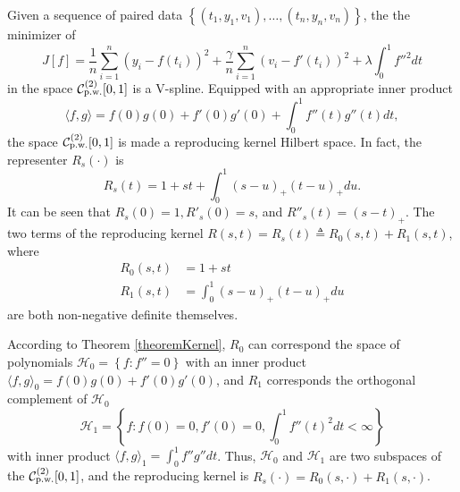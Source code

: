 Given a sequence of paired data $\left\lbrace (t_1,y_1,v_1),\ldots, (t_n,y_n,v_n) \right\rbrace$, the the minimizer of 
\begin{equation}\label{maineq}
J[f]=\frac{1}{n}\sum_{i=1}^{n}(y_i-f(t_i))^2+\frac{\gamma}{n}\sum_{i=1}^{n}(v_i-f'(t_i))^2+\lambda \int_{0}^{1}f''^2dt
\end{equation}
in the space $\mathcal{C}_{\mbox{\scriptsize p.w.}}^{(2)}[0,1]$ is a V-spline. Equipped with an appropriate inner product
\begin{equation}\label{TractorSplineInnerProduct}
\langle f,g \rangle=f(0) g(0)+f'(0) g'(0)+\int_{0}^{1}f''(t)g''(t)dt,
\end{equation}
the space $\mathcal{C}_{\mbox{\scriptsize p.w.}}^{(2)}[0,1]$ is made a reproducing kernel Hilbert space. In fact, the representer $R_s(\cdot)$ is 
\begin{equation}\label{kerneleq}
R_s(t)=1+st+\int_{0}^{1} (s-u)_+(t-u)_+du.
\end{equation}
It can be seen that $R_s(0)=1, R'_s(0)=s$, and $R''_s(t)=(s-t)_+$. The two terms of the reproducing kernel $R(s,t)=R_s(t)\triangleq R_0(s,t)+R_1(s,t)$, where
\begin{align} \label{TractorSplineKernelR0}
R_0(s,t)&=1+st \\ \label{TractorSplineKernelR1}
R_1(s,t)&=\int_{0}^{1} (s-u)_+(t-u)_+du
\end{align}
are both non-negative definite themselves.


According to Theorem \ref{theoremKernel}, $R_0$ can correspond the space of polynomials $\mathcal{H}_0=\left\lbrace f:f''=0\right\rbrace$ with an inner product $\langle f,g \rangle_0= f(0)g(0)+f'(0)g'(0)$, and $R_1$ corresponds the orthogonal complement of $\mathcal{H}_0$
\begin{equation}
\mathcal{H}_1=\left\lbrace f:f(0)=0, f'(0)=0, \int_{0}^{1}f''(t)^2dt<\infty\right\rbrace
\end{equation}
with inner product $\langle f,g \rangle_1=\int_{0}^{1}f''g''dt$. Thus, $\mathcal{H}_0$ and $\mathcal{H}_1$ are two subspaces of the $\mathcal{C}_{\mbox{\scriptsize p.w.}}^{(2)}[0,1]$, and the reproducing kernel is $R_s(\cdot) = R_0(s,\cdot)+R_1(s,\cdot)$.


